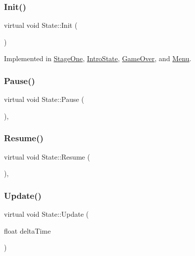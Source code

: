 \subsubsection{\texorpdfstring{Init()}{Init()}}
{\footnotesize\ttfamily virtual void State\+::\+Init (\begin{DoxyParamCaption}{ }\end{DoxyParamCaption})\hspace{0.3cm}{\ttfamily [pure virtual]}}



Implemented in \mbox{\hyperlink{classStageOne_a661f4913ad0f6cc348c19bfa86c0c489}{Stage\+One}}, \mbox{\hyperlink{classIntroState_a065e914b336c162b1467845c7126c920}{Intro\+State}}, \mbox{\hyperlink{classGameOver_ac13d1bd0fe9f8db0ef0301c9ec63a9e0}{Game\+Over}}, and \mbox{\hyperlink{classMenu_a2d4c37774fe4c5efe08ee436b0bb1c76}{Menu}}.

\mbox{\label{classState_aeba18061e63cd52551a045fb94836298}} 
\subsubsection{\texorpdfstring{Pause()}{Pause()}}
{\footnotesize\ttfamily virtual void State\+::\+Pause (\begin{DoxyParamCaption}{ }\end{DoxyParamCaption})\hspace{0.3cm}{\ttfamily [inline]}, {\ttfamily [virtual]}}

\mbox{\label{classState_a8c585ea3e766c2e2404a957907310983}} 
\subsubsection{\texorpdfstring{Resume()}{Resume()}}
{\footnotesize\ttfamily virtual void State\+::\+Resume (\begin{DoxyParamCaption}{ }\end{DoxyParamCaption})\hspace{0.3cm}{\ttfamily [inline]}, {\ttfamily [virtual]}}

\mbox{\label{classState_a770f40188fdfc64bc95a5166fef12e02}} 
\subsubsection{\texorpdfstring{Update()}{Update()}}
{\footnotesize\ttfamily virtual void State\+::\+Update (\begin{DoxyParamCaption}\item[{float}]{delta\+Time }\end{DoxyParamCaption})\hspace{0.3cm}{\ttfamily [pure virtual]}}



